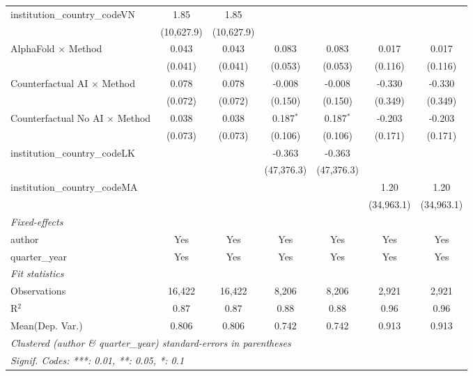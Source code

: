 \begin{tabular}{lcccccc}
   institution\_country\_codeVN          & 1.85          & 1.85          &               &               &               &   \\   
                                         & (10,627.9)    & (10,627.9)    &               &               &               &   \\   
   AlphaFold $\times$ Method             & 0.043         & 0.043         & 0.083         & 0.083         & 0.017         & 0.017\\   
                                         & (0.041)       & (0.041)       & (0.053)       & (0.053)       & (0.116)       & (0.116)\\   
   Counterfactual AI $\times$ Method     & 0.078         & 0.078         & -0.008        & -0.008        & -0.330        & -0.330\\   
                                         & (0.072)       & (0.072)       & (0.150)       & (0.150)       & (0.349)       & (0.349)\\   
   Counterfactual No AI $\times$ Method  & 0.038         & 0.038         & 0.187$^{*}$   & 0.187$^{*}$   & -0.203        & -0.203\\   
                                         & (0.073)       & (0.073)       & (0.106)       & (0.106)       & (0.171)       & (0.171)\\   
   institution\_country\_codeLK          &               &               & -0.363        & -0.363        &               &   \\   
                                         &               &               & (47,376.3)    & (47,376.3)    &               &   \\   
   institution\_country\_codeMA          &               &               &               &               & 1.20          & 1.20\\   
                                         &               &               &               &               & (34,963.1)    & (34,963.1)\\   
   \midrule
   \emph{Fixed-effects}\\
   author                                & Yes           & Yes           & Yes           & Yes           & Yes           & Yes\\  
   quarter\_year                         & Yes           & Yes           & Yes           & Yes           & Yes           & Yes\\  
   \midrule
   \emph{Fit statistics}\\
   Observations                          & 16,422        & 16,422        & 8,206         & 8,206         & 2,921         & 2,921\\  
   R$^2$                                 & 0.87          & 0.87          & 0.88          & 0.88          & 0.96          & 0.96\\  
Mean(Dep. Var.) & 0.806 & 0.806 & 0.742 & 0.742 & 0.913 & 0.913 \\
   \midrule \midrule
   \multicolumn{7}{l}{\emph{Clustered (author \& quarter\_year) standard-errors in parentheses}}\\
   \multicolumn{7}{l}{\emph{Signif. Codes: ***: 0.01, **: 0.05, *: 0.1}}\\
\end{tabular}
\par\endgroup
